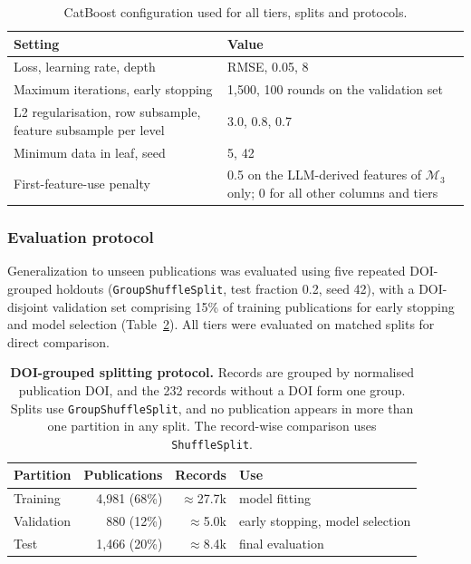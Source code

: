 \documentclass[3p]{elsarticle}
\begin{document}
\begin{table}[htbp]
    \centering\small
    \caption{CatBoost configuration used for all tiers, splits and protocols.}
    \label{tab:config}
    \begin{tabular}{p{7.4cm}p{7.4cm}}
        \toprule
        Setting & Value \\
        \midrule
        Loss, learning rate, depth & RMSE, 0.05, 8 \\
        Maximum iterations, early stopping & 1,500, 100 rounds on the validation set \\
        L2 regularisation, row subsample, feature subsample per level & 3.0, 0.8, 0.7 \\
        Minimum data in leaf, seed & 5, 42 \\
        First-feature-use penalty & 0.5 on the LLM-derived features of $\mathcal{M}_3$ only; 0 for all other columns and tiers \\
        \bottomrule
    \end{tabular}
\end{table}

\subsubsection{Evaluation protocol}

Generalization to unseen publications was evaluated using five repeated DOI-grouped holdouts (\texttt{GroupShuffleSplit}, test fraction 0.2, seed 42), with a DOI-disjoint validation set comprising 15\% of training publications for early stopping and model selection (Table~\ref{tab:protocol}). All tiers were evaluated on matched splits for direct comparison.


\begin{table}[htbp]
    \centering\small
    \caption{\textbf{DOI-grouped splitting protocol.} Records are grouped by normalised publication DOI, and the 232 records without a DOI form one group. Splits use \texttt{GroupShuffleSplit}, and no publication appears in more than one partition in any split. The record-wise comparison uses \texttt{ShuffleSplit}.}
    \label{tab:protocol}
    \begin{tabular}{@{}lrrl@{}}
        \toprule
        Partition  & Publications & Records       & Use \\
        \midrule
        Training   & 4,981 (68\%) & $\approx$27.7k & model fitting \\
        Validation & 880 (12\%)   & $\approx$5.0k  & early stopping, model selection \\
        Test       & 1,466 (20\%) & $\approx$8.4k  & final evaluation \\
        \bottomrule
    \end{tabular}
\end{table}
\end{document}
